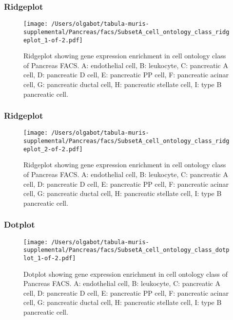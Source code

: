 \clearpage
\clearpage
\subsubsection{Ridgeplot}
\begin{figure}[h]
\centering
\texttt{[image: /Users/olgabot/tabula-muris-supplemental/Pancreas/facs/SubsetA\_cell\_ontology\_class\_ridgeplot\_1-of-2.pdf]}

\caption{ Ridgeplot  showing gene expression enrichment in cell ontology class of Pancreas FACS. A: endothelial cell, B: leukocyte, C: pancreatic A cell, D: pancreatic D cell, E: pancreatic PP cell, F: pancreatic acinar cell, G: pancreatic ductal cell, H: pancreatic stellate cell, I: type B pancreatic cell.}
\end{figure}


\clearpage
\clearpage
\subsubsection{Ridgeplot}
\begin{figure}[h]
\centering
\texttt{[image: /Users/olgabot/tabula-muris-supplemental/Pancreas/facs/SubsetA\_cell\_ontology\_class\_ridgeplot\_2-of-2.pdf]}

\caption{ Ridgeplot  showing gene expression enrichment in cell ontology class of Pancreas FACS. A: endothelial cell, B: leukocyte, C: pancreatic A cell, D: pancreatic D cell, E: pancreatic PP cell, F: pancreatic acinar cell, G: pancreatic ductal cell, H: pancreatic stellate cell, I: type B pancreatic cell.}
\end{figure}


\clearpage
\clearpage
\subsubsection{Dotplot}
\begin{figure}[h]
\centering
\texttt{[image: /Users/olgabot/tabula-muris-supplemental/Pancreas/facs/SubsetA\_cell\_ontology\_class\_dotplot\_1-of-2.pdf]}

\caption{ Dotplot  showing gene expression enrichment in cell ontology class of Pancreas FACS. A: endothelial cell, B: leukocyte, C: pancreatic A cell, D: pancreatic D cell, E: pancreatic PP cell, F: pancreatic acinar cell, G: pancreatic ductal cell, H: pancreatic stellate cell, I: type B pancreatic cell.}
\end{figure}


